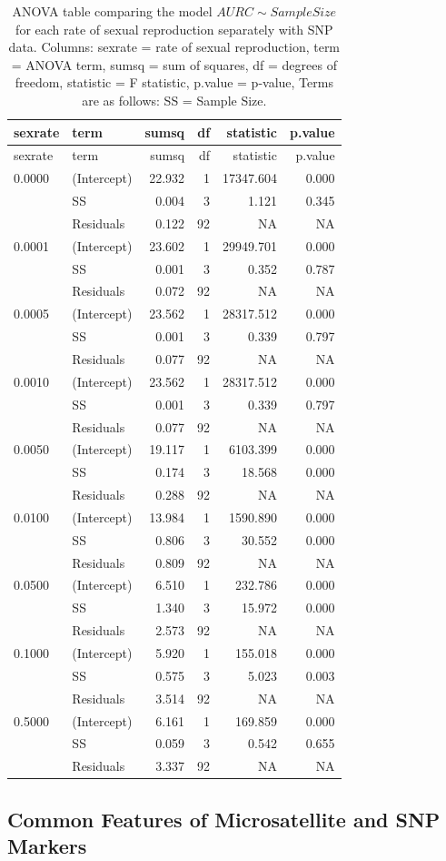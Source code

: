 \documentclass[double,11pt]{beavtex}
\begin{document}
  \begin{longtable}[]{@{}llrrrr@{}}
  \caption{\label{tab:sim5} ANOVA table comparing the model
  \(AURC \sim Sample Size\) for each rate of sexual reproduction
  separately with SNP data. Columns: sexrate = rate of sexual
  reproduction, term = ANOVA term, sumsq = sum of squares, df = degrees of
  freedom, statistic = F statistic, p.value = p-value, Terms are as
  follows: SS = Sample Size.}\tabularnewline
  \toprule
  sexrate & term & sumsq & df & statistic & p.value\tabularnewline
  \midrule
  \endfirsthead
  \toprule
  sexrate & term & sumsq & df & statistic & p.value\tabularnewline
  \midrule
  \endhead
  0.0000 & (Intercept) & 22.932 & 1 & 17347.604 & 0.000\tabularnewline
  & SS & 0.004 & 3 & 1.121 & 0.345\tabularnewline
  & Residuals & 0.122 & 92 & NA & NA\tabularnewline
  0.0001 & (Intercept) & 23.602 & 1 & 29949.701 & 0.000\tabularnewline
  & SS & 0.001 & 3 & 0.352 & 0.787\tabularnewline
  & Residuals & 0.072 & 92 & NA & NA\tabularnewline
  0.0005 & (Intercept) & 23.562 & 1 & 28317.512 & 0.000\tabularnewline
  & SS & 0.001 & 3 & 0.339 & 0.797\tabularnewline
  & Residuals & 0.077 & 92 & NA & NA\tabularnewline
  0.0010 & (Intercept) & 23.562 & 1 & 28317.512 & 0.000\tabularnewline
  & SS & 0.001 & 3 & 0.339 & 0.797\tabularnewline
  & Residuals & 0.077 & 92 & NA & NA\tabularnewline
  0.0050 & (Intercept) & 19.117 & 1 & 6103.399 & 0.000\tabularnewline
  & SS & 0.174 & 3 & 18.568 & 0.000\tabularnewline
  & Residuals & 0.288 & 92 & NA & NA\tabularnewline
  0.0100 & (Intercept) & 13.984 & 1 & 1590.890 & 0.000\tabularnewline
  & SS & 0.806 & 3 & 30.552 & 0.000\tabularnewline
  & Residuals & 0.809 & 92 & NA & NA\tabularnewline
  0.0500 & (Intercept) & 6.510 & 1 & 232.786 & 0.000\tabularnewline
  & SS & 1.340 & 3 & 15.972 & 0.000\tabularnewline
  & Residuals & 2.573 & 92 & NA & NA\tabularnewline
  0.1000 & (Intercept) & 5.920 & 1 & 155.018 & 0.000\tabularnewline
  & SS & 0.575 & 3 & 5.023 & 0.003\tabularnewline
  & Residuals & 3.514 & 92 & NA & NA\tabularnewline
  0.5000 & (Intercept) & 6.161 & 1 & 169.859 & 0.000\tabularnewline
  & SS & 0.059 & 3 & 0.542 & 0.655\tabularnewline
  & Residuals & 3.337 & 92 & NA & NA\tabularnewline
  \bottomrule
  \end{longtable}
  
  \subsection{Common Features of Microsatellite and SNP
  Markers}\label{common-features-of-microsatellite-and-snp-markers}
  
\end{document}
